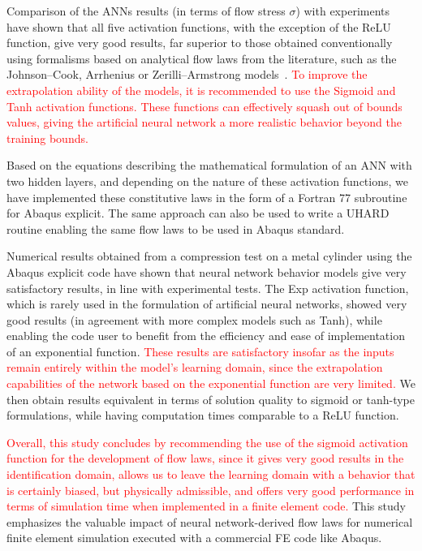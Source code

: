 \documentclass[algorithms,article,submit,pdftex,oneauthors]{Definitions/mdpi}
\begin{document}
\textcolor{greencolor}{Comparison of the ANNs results (in terms of flow stress $\sigma$) with experiments have shown that all five activation functions, with the exception of the ReLU function, give very good results, far superior to those obtained conventionally using formalisms based on analytical flow laws from the literature, such as the Johnson--Cook, Arrhenius or Zerilli--Armstrong models~\cite{Tize-2023-IEP}.}
\textcolor{red}{To improve the extrapolation ability of the models, it is recommended to use the Sigmoid and Tanh activation functions.
These functions can effectively squash out of bounds values, giving the artificial neural network a more realistic behavior beyond the training bounds.}

Based on the equations describing the mathematical formulation of an ANN with two hidden layers, and depending on the nature of these activation functions, we have implemented these constitutive laws in the form of a Fortran 77 subroutine for Abaqus explicit.
The same approach can also be used to write a UHARD routine enabling the same flow laws to be used in Abaqus standard.

Numerical results obtained from a compression test on a metal cylinder using the Abaqus explicit code have shown that neural network behavior models give very satisfactory results, in line with experimental tests.
The Exp activation function, which is rarely used in the formulation of artificial neural networks, showed very good results (in agreement with more complex models such as Tanh), while enabling the code user to benefit from the efficiency and ease of implementation of an exponential function.
\textcolor{red}{These results are satisfactory insofar as the inputs remain entirely within the model's learning domain, since the extrapolation capabilities of the network based on the exponential function are very limited.}
We then obtain results equivalent in terms of solution quality to sigmoid or tanh-type formulations, while having computation times comparable to a ReLU function.

\textcolor{red}{Overall, this study concludes by recommending the use of the sigmoid activation function for the development of flow laws, since it gives very good results in the identification domain, allows us to leave the learning domain with a behavior that is certainly biased, but physically admissible, and offers very good performance in terms of simulation time when implemented in a finite element code.}
This study emphasizes the valuable impact of neural network-derived flow laws for numerical finite element simulation executed with a commercial FE code like Abaqus.
\end{document}

